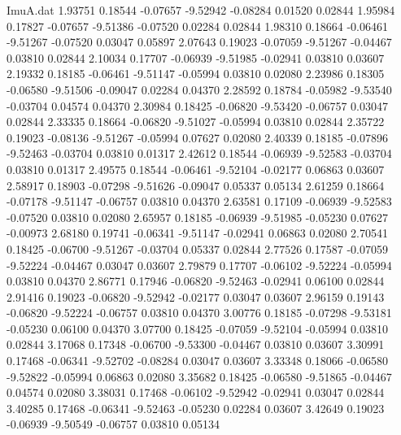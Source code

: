 \begin{filecontents}{ImuA.dat}
   1.93751    0.18544   -0.07657   -9.52942   -0.08284    0.01520    0.02844
   1.95984    0.17827   -0.07657   -9.51386   -0.07520    0.02284    0.02844
   1.98310    0.18664   -0.06461   -9.51267   -0.07520    0.03047    0.05897
   2.07643    0.19023   -0.07059   -9.51267   -0.04467    0.03810    0.02844
   2.10034    0.17707   -0.06939   -9.51985   -0.02941    0.03810    0.03607
   2.19332    0.18185   -0.06461   -9.51147   -0.05994    0.03810    0.02080
   2.23986    0.18305   -0.06580   -9.51506   -0.09047    0.02284    0.04370
   2.28592    0.18784   -0.05982   -9.53540   -0.03704    0.04574    0.04370
   2.30984    0.18425   -0.06820   -9.53420   -0.06757    0.03047    0.02844
   2.33335    0.18664   -0.06820   -9.51027   -0.05994    0.03810    0.02844
   2.35722    0.19023   -0.08136   -9.51267   -0.05994    0.07627    0.02080
   2.40339    0.18185   -0.07896   -9.52463   -0.03704    0.03810    0.01317
   2.42612    0.18544   -0.06939   -9.52583   -0.03704    0.03810    0.01317
   2.49575    0.18544   -0.06461   -9.52104   -0.02177    0.06863    0.03607
   2.58917    0.18903   -0.07298   -9.51626   -0.09047    0.05337    0.05134
   2.61259    0.18664   -0.07178   -9.51147   -0.06757    0.03810    0.04370
   2.63581    0.17109   -0.06939   -9.52583   -0.07520    0.03810    0.02080
   2.65957    0.18185   -0.06939   -9.51985   -0.05230    0.07627   -0.00973
   2.68180    0.19741   -0.06341   -9.51147   -0.02941    0.06863    0.02080
   2.70541    0.18425   -0.06700   -9.51267   -0.03704    0.05337    0.02844
   2.77526    0.17587   -0.07059   -9.52224   -0.04467    0.03047    0.03607
   2.79879    0.17707   -0.06102   -9.52224   -0.05994    0.03810    0.04370
   2.86771    0.17946   -0.06820   -9.52463   -0.02941    0.06100    0.02844
   2.91416    0.19023   -0.06820   -9.52942   -0.02177    0.03047    0.03607
   2.96159    0.19143   -0.06820   -9.52224   -0.06757    0.03810    0.04370
   3.00776    0.18185   -0.07298   -9.53181   -0.05230    0.06100    0.04370
   3.07700    0.18425   -0.07059   -9.52104   -0.05994    0.03810    0.02844
   3.17068    0.17348   -0.06700   -9.53300   -0.04467    0.03810    0.03607
   3.30991    0.17468   -0.06341   -9.52702   -0.08284    0.03047    0.03607
   3.33348    0.18066   -0.06580   -9.52822   -0.05994    0.06863    0.02080
   3.35682    0.18425   -0.06580   -9.51865   -0.04467    0.04574    0.02080
   3.38031    0.17468   -0.06102   -9.52942   -0.02941    0.03047    0.02844
   3.40285    0.17468   -0.06341   -9.52463   -0.05230    0.02284    0.03607
   3.42649    0.19023   -0.06939   -9.50549   -0.06757    0.03810    0.05134

\end{filecontents}
